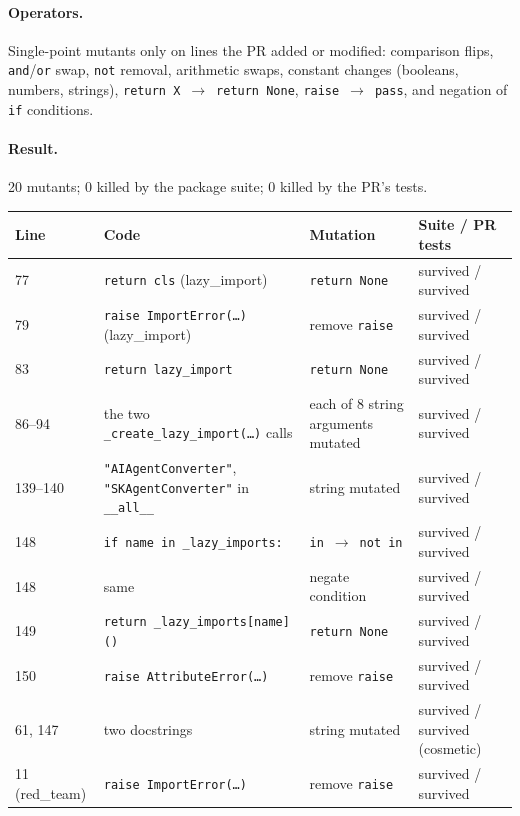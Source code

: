 \documentclass[11pt,a4paper]{article}
\newcommand{\code}[1]{\texttt{#1}}
\begin{document}
\paragraph{Operators.} Single-point mutants only on lines the PR added or modified: comparison flips, \code{and}/\code{or} swap, \code{not} removal, arithmetic swaps, constant changes (booleans, numbers, strings), \code{return X}~$\to$~\code{return None}, \code{raise}~$\to$~\code{pass}, and negation of \code{if} conditions.

\paragraph{Result.} 20 mutants; 0 killed by the package suite; 0 killed by the PR's tests.

\begin{center}\small
\begin{tabularx}{\textwidth}{l X X l}
\toprule
Line & Code & Mutation & Suite / PR tests \\
\midrule
77 & \code{return cls} (lazy\_import) & \code{return None} & survived / survived \\
79 & \code{raise ImportError(\ldots)} (lazy\_import) & remove \code{raise} & survived / survived \\
83 & \code{return lazy\_import} & \code{return None} & survived / survived \\
86--94 & the two \code{\_create\_lazy\_import(\ldots)} calls & each of 8 string arguments mutated & survived / survived \\
139--140 & \code{"AIAgentConverter"}, \code{"SKAgentConverter"} in \code{\_\_all\_\_} & string mutated & survived / survived \\
148 & \code{if name in \_lazy\_imports:} & \code{in}~$\to$~\code{not in} & survived / survived \\
148 & same & negate condition & survived / survived \\
149 & \code{return \_lazy\_imports[name]()} & \code{return None} & survived / survived \\
150 & \code{raise AttributeError(\ldots)} & remove \code{raise} & survived / survived \\
61, 147 & two docstrings & string mutated & survived / survived (cosmetic) \\
11 (red\_team) & \code{raise ImportError(\ldots)} & remove \code{raise} & survived / survived \\
\bottomrule
\end{tabularx}
\end{center}
\end{document}
